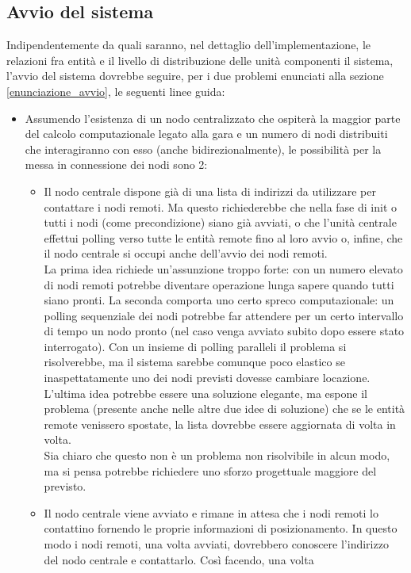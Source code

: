 \subsection{Avvio del sistema}
Indipendentemente da quali saranno, nel dettaglio dell'implementazione, le
relazioni fra entità e il livello di distribuzione
delle unità componenti il sistema, l'avvio del sistema dovrebbe seguire, per i
due problemi enunciati alla sezione \ref{enunciazione_avvio},
le seguenti linee guida:
\begin{itemize}
\item Assumendo l'esistenza di un nodo centralizzato che ospiterà la maggior
parte del calcolo computazionale legato alla gara e
un numero di nodi distribuiti che interagiranno con esso (anche
bidirezionalmente), le possibilità per la messa in connessione
dei nodi sono 2:
\begin{itemize}
\item Il nodo centrale dispone già di una lista di indirizzi da utilizzare per
contattare i nodi remoti. Ma questo richiederebbe
che nella fase di init o tutti i nodi (come precondizione) siano già avviati, o
che l'unità centrale effettui polling verso tutte
le entità remote fino al loro avvio o, infine, che il nodo centrale si occupi
anche dell'avvio dei nodi remoti. \\
La prima idea richiede un'assunzione troppo forte: con un numero elevato di nodi
remoti potrebbe diventare operazione
lunga sapere quando tutti siano pronti. La seconda comporta uno certo spreco
computazionale: un polling sequenziale dei nodi
potrebbe far attendere per un certo intervallo di tempo un nodo pronto (nel caso
venga avviato subito dopo essere stato interrogato).
Con un insieme di polling paralleli il problema si risolverebbe, ma il sistema
sarebbe comunque poco elastico se inaspettatamente
uno dei nodi previsti dovesse cambiare locazione.
L'ultima idea potrebbe essere una soluzione elegante, ma espone il problema
(presente anche nelle altre due idee di soluzione)
che se le entità remote venissero spostate, la lista dovrebbe essere aggiornata
di volta in volta.\\
Sia chiaro che questo non è un problema non risolvibile in alcun modo, ma si
pensa potrebbe richiedere uno sforzo progettuale maggiore del previsto.
\item Il nodo centrale viene avviato e rimane in attesa che i nodi remoti lo
contattino fornendo le proprie informazioni di posizionamento.
In questo modo i nodi remoti, una volta avviati, dovrebbero conoscere
l'indirizzo del nodo centrale e contattarlo. Così facendo, una volta

\end{itemize}
\end{itemize}
